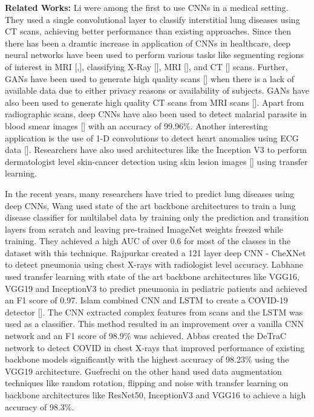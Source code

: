\documentclass[10pt,twocolumn,letterpaper]{article}
\begin{document}
\textbf{Related Works:} 
Li \etal [] were among the first
to use CNNs in a medical setting. They used a single convolutional layer to classify 
interstitial lung diseases using CT scans, achieving better performance than existing 
approaches. Since then there has been a dramtic increase in application of CNNs 
in healthcare, deep neural networks have been used to perform various tasks like 
segmenting regions of interest in MRI [,], classifying X-Ray  
[], MRI [], and CT [] scans.
Further, GANs have been used to generate high quality scans [] 
when there is a lack of available data due to either privacy reasons or availability of subjects. 
GANs have also been used to generate high quality CT scans from MRI scans 
[]. Apart from radiographic scans,
deep CNNs have also been used to detect malarial parasite in blood smear images 
[] with an accuracy of 99.96\%. Another interesting 
application is the use of 1-D convolutions to detect heart anomalies using ECG data
[]. Researchers have also used architectures like the Inception V3 to perform 
dermatologist level skin-cancer detection using skin lesion images [] using transfer 
learning.  

In the recent years, many researchers have tried to predict lung diseases using deep CNNs, 
Wang \etal \cite{wang2017chestx} used state of the art backbone architectures to train 
a lung disease classifier for multilabel data by training only the prediction and transition 
layers from scratch and leaving pre-trained ImageNet weights freezed while training. 
They achieved a high AUC of over 0.6 for most of the classes in the dataset with this technique.
Rajpurkar \etal [] created a 121 layer deep CNN - CheXNet to detect
pneumonia using chest X-rays with radiologist level accuracy. 
Labhane \etal [] used transfer learning with state of the art backbone architectures like VGG16, 
VGG19 and InceptionV3 to predict pneumonia in pediatric patients and achieved an F1 score of 0.97.
Islam \etal combined CNN and LSTM 
to create a COVID-19 detector []. The CNN extracted complex features from scans and the LSTM was 
used as a classifier. This method resulted in an improvement over a vanilla CNN network and 
an F1 score of 98.9\% was achieved. Abbas \etal [] created the 
DeTraC network to detect COVID in chest X-rays that improved performance of existing backbone 
models significantly with the highest accuracy of 98.23\% using the VGG19 architecture.  
Guefrechi \etal [] on the other hand used data augmentation techniques like random rotation, 
flipping and noise with transfer learning on backbone architectures like ResNet50, 
InceptionV3 and VGG16 to achieve a high accuracy of 98.3\%.
\end{document}
